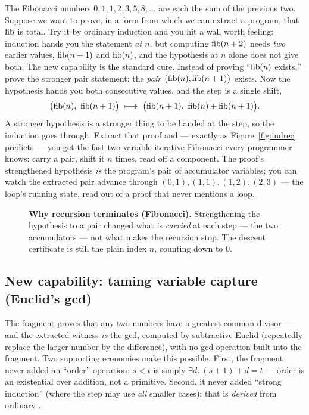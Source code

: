 \documentclass[11pt]{article}
\begin{document}
The Fibonacci numbers $0,1,1,2,3,5,8,\dots$ are each the sum of the previous
two. Suppose we want to prove, in a form from which we can extract a program,
that $\operatorname{fib}$ is total. Try it by ordinary induction and you hit a wall worth
feeling: induction hands you the statement \emph{at $n$}, but computing
$\operatorname{fib}(n+2)$ needs \emph{two} earlier values, $\operatorname{fib}(n+1)$ and $\operatorname{fib}(n)$, and the
hypothesis at $n$ alone does not give both. The new capability is the standard
cure. Instead of proving ``$\operatorname{fib}(n)$ exists,'' prove the stronger pair
statement: the \emph{pair} $\bigl(\operatorname{fib}(n),\operatorname{fib}(n+1)\bigr)$ exists. Now the
hypothesis hands you both consecutive values, and the step is a single shift,
\[
  \bigl(\fib(n),\ \fib(n+1)\bigr)\ \longmapsto\
  \bigl(\fib(n+1),\ \fib(n)+\fib(n+1)\bigr).
\]
A stronger hypothesis is a stronger thing to be handed at the step, so the
induction goes through. Extract that proof and --- exactly as
Figure~\ref{fig:indrec} predicts --- you get the fast two-variable iterative
Fibonacci every programmer knows: carry a pair, shift it $n$ times, read off a
component. The proof's strengthened hypothesis \emph{is} the program's pair of
accumulator variables; you can watch the extracted pair advance through
$(0,1),(1,1),(1,2),(2,3)$ --- the loop's running state, read out of a proof
that never mentions a loop.

\begin{figure}[h]
\centering
{}
\caption{\textbf{Why recursion terminates (Fibonacci).} Strengthening the
hypothesis to a pair changed what is \emph{carried} at each step --- the two
accumulators --- not what makes the recursion stop. The descent certificate is
still the plain index $n$, counting down to $0$.}
\label{fig:desc-fib}
\end{figure}

\subsection*{New capability: taming variable capture (Euclid's gcd)}

The fragment proves that any two numbers have a greatest common divisor --- and
the extracted witness \emph{is} the gcd, computed by subtractive Euclid
(repeatedly replace the larger number by the difference), with no gcd operation
built into the fragment. Two supporting economies make this possible. First,
the fragment never added an ``order'' operation: $s<t$ is simply $\exists d.\
(s+1)+d=t$ --- order is an existential over addition, not a primitive. Second,
it never added ``strong induction'' (where the step may use \emph{all} smaller
cases); that is \emph{derived} from ordinary \code{ind}.
\end{document}

